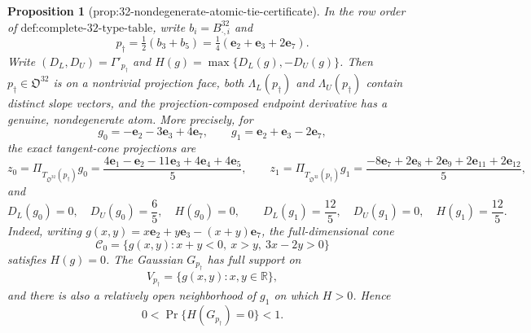 \documentclass{article}
\newtheorem{proposition}{Proposition}
\begin{document}
\begin{proposition}[prop:32-nondegenerate-atomic-tie-certificate]\label{prop:32-nondegenerate-atomic-tie-certificate}
In the row order of \(\text{def:complete-32-type-table}\), write \(b_i=B^{32}_{\cdot,i}\) and
\[
p_\dagger=\tfrac12(b_3+b_5)=\tfrac14(\mathbf e_2+\mathbf e_3+2\mathbf e_7).
\]
Write \((D_L,D_U)=\Gamma'_{p_\dagger}\) and \(H(g)=\max\{D_L(g),-D_U(g)\}\).  Then \(p_\dagger\in\mathfrak O^{32}\) is on a nontrivial projection face, both \(\Lambda_L(p_\dagger)\) and \(\Lambda_U(p_\dagger)\) contain distinct slope vectors, and the projection-composed endpoint derivative has a genuine, nondegenerate atom.  More precisely, for
\[
g_0=-\mathbf e_2-3\mathbf e_3+4\mathbf e_7,
\qquad
g_1=\mathbf e_2+\mathbf e_3-2\mathbf e_7,
\]
the exact tangent-cone projections are
\[
z_0=\Pi_{T_{\mathfrak O^{32}}(p_\dagger)}g_0
=\frac{4\mathbf e_1-\mathbf e_2-11\mathbf e_3+4\mathbf e_4+4\mathbf e_5}{5},
\qquad
z_1=\Pi_{T_{\mathfrak O^{32}}(p_\dagger)}g_1
=\frac{-8\mathbf e_7+2\mathbf e_8+2\mathbf e_9+2\mathbf e_{11}+2\mathbf e_{12}}{5},
\]
and
\[
D_L(g_0)=0,\quad D_U(g_0)=\frac65,\quad H(g_0)=0,
\qquad
D_L(g_1)=\frac{12}{5},\quad D_U(g_1)=0,\quad H(g_1)=\frac{12}{5}.
\]
Indeed, writing \(g(x,y)=x\mathbf e_2+y\mathbf e_3-(x+y)\mathbf e_7\), the full-dimensional cone
\[
\mathcal C_0=\{g(x,y):x+y<0,\ x>y,\ 3x-2y>0\}
\]
satisfies \(H(g)=0\).  The Gaussian \(G_{p_\dagger}\) has full support on
\[
V_{p_\dagger}=\{g(x,y):x,y\in\mathbb R\},
\]
and there is also a relatively open neighborhood of \(g_1\) on which \(H>0\).  Hence
\[
0<\Pr\{H(G_{p_\dagger})=0\}<1.
\]
\end{proposition}
\end{document}
